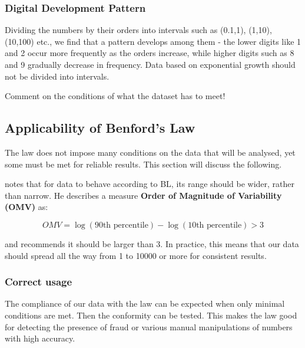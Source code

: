 \subsubsection{Digital Development Pattern}

Dividing the numbers by their orders into intervals such as (0.1,1), (1,10), (10,100) etc., we find that a pattern develops among them - the lower digits like 1 and 2 occur more frequently as the orders increase, while higher digits such as 8 and 9 gradually decrease in frequency. Data based on exponential growth should not be divided into intervals. \cite{kossovsky2014benford} %

\begin{koment}
Comment on the conditions of what the dataset has to meet! 
\end{koment}

\subsection{Applicability of Benford's Law}

The law does not impose many conditions on the data that will be analysed, yet some must be met for reliable results. This section will discuss the following. 

\citeauthor{kossovsky2014benford} notes that for data to behave according to BL, its range should be wider, rather than narrow. He describes a measure \textbf{Order of Magnitude of Variability (OMV)} as:  

\begin{equation}
    OMV = \log(\text{90th percentile}) - \log(\text{10th percentile}) > 3 
    \label{OMV}
\end{equation}

and recommends it should be larger than 3. In practice, this means that our data should spread all the way from 1 to 10000 or more for consistent results. 
 
\subsubsection*{Correct usage} 

The compliance of our data with the law can be expected when only minimal conditions are met. Then the conformity can be tested. This makes the law good for detecting the presence of fraud or various manual manipulations of numbers with high accuracy. \cite{kossovsky2014benford, Cerqueti2202,kossovsky2014benford} 

